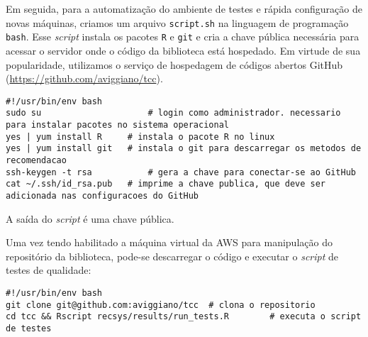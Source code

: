 
Em seguida, para a automatização do ambiente de testes e rápida configuração de novas máquinas, criamos um arquivo \texttt{script.sh} na linguagem de programação \texttt{bash}. Esse \textit{script} instala os pacotes \texttt{R} e \texttt{git} e cria a chave pública necessária para acessar o servidor onde o código da biblioteca está hospedado. Em virtude de sua popularidade, utilizamos o serviço de hospedagem de códigos abertos GitHub (\url{https://github.com/aviggiano/tcc}). 

\begin{lstlisting}[caption=\textit{Script} de configuração do ambiente de testes]
#!/usr/bin/env bash
sudo su						# login como administrador. necessario para instalar pacotes no sistema operacional
yes | yum install R		# instala o pacote R no linux
yes | yum install git	# instala o git para descarregar os metodos de recomendacao
ssh-keygen -t rsa			# gera a chave para conectar-se ao GitHub
cat ~/.ssh/id_rsa.pub	# imprime a chave publica, que deve ser adicionada nas configuracoes do GitHub
\end{lstlisting}

A saída do \textit{script} é uma chave pública.

Uma vez tendo habilitado a máquina virtual da AWS para manipulação do repositório da biblioteca, pode-se descarregar o código e executar o \textit{script} de testes de qualidade:

\begin{lstlisting}[caption=Script de execução dos testes de qualidade]
#!/usr/bin/env bash
git clone git@github.com:aviggiano/tcc	# clona o repositorio
cd tcc && Rscript recsys/results/run_tests.R 		# executa o script de testes
\end{lstlisting}